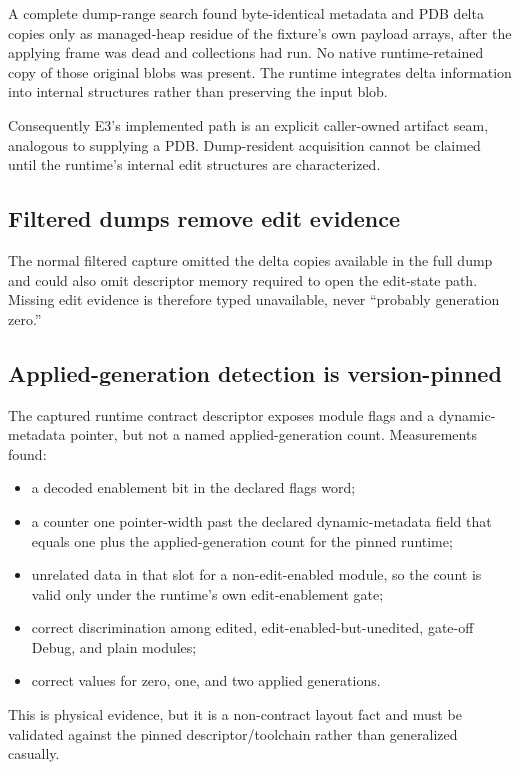 \documentclass[11pt,oneside,openany]{book}
\begin{document}
A complete dump-range search found byte-identical metadata and PDB delta copies only as managed-heap residue of the fixture's own payload arrays, after the applying frame was dead and collections had run. No native runtime-retained copy of those original blobs was present. The runtime integrates delta information into internal structures rather than preserving the input blob.

Consequently E3's implemented path is an explicit caller-owned artifact seam, analogous to supplying a PDB. Dump-resident acquisition cannot be claimed until the runtime's internal edit structures are characterized.

\subsection{Filtered dumps remove edit evidence}

The normal filtered capture omitted the delta copies available in the full dump and could also omit descriptor memory required to open the edit-state path. Missing edit evidence is therefore typed unavailable, never ``probably generation zero.''

\subsection{Applied-generation detection is version-pinned}

The captured runtime contract descriptor exposes module flags and a dynamic-metadata pointer, but not a named applied-generation count. Measurements found:

\begin{itemize}
  \item a decoded enablement bit in the declared flags word;
  \item a counter one pointer-width past the declared dynamic-metadata field that equals one plus the applied-generation count for the pinned runtime;
  \item unrelated data in that slot for a non-edit-enabled module, so the count is valid only under the runtime's own edit-enablement gate;
  \item correct discrimination among edited, edit-enabled-but-unedited, gate-off Debug, and plain modules;
  \item correct values for zero, one, and two applied generations.
\end{itemize}

This is physical evidence, but it is a non-contract layout fact and must be validated against the pinned descriptor/toolchain rather than generalized casually.
\end{document}
